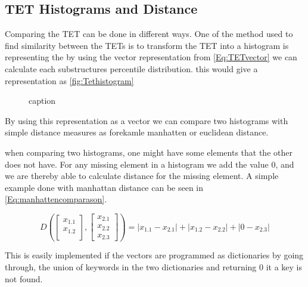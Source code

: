 \subsection{TET Histograms and Distance}
	Comparing the TET can be done in different ways. One of the method used to find similarity between the TETs is to transform the TET into a histogram is representing the by using the vector representation from \autoref{Eq:TETvector} we can calculate each substructures percentile distribution. this would give a representation as \autoref{fig:Tethistogram}
	
	\begin{figure}[H]
		\centering
		\begin{adjustbox}{width=0.5\textwidth}
			
		\end{adjustbox}
		\caption{caption}
		\label{fig:Tethistogram}
	\end{figure}
	
	By using this representation as a vector we can compare two histograms with simple distance measures as forekamle manhatten or euclidean distance.
	
	when comparing two histograms, one might have some elements that the other does not have. For any missing element in a histogram we add the value $0$, and we are thereby able to calculate distance for the missing element. A simple example done with manhattan distance can be seen in \autoref{Eq:manhattencomparason}.
	
	\begin{equation}\label{Eq:manhattencomparason}
	D(\begin{bmatrix}
	x_{1.1} \\
	x_{1.2} \\
	\end{bmatrix},
	\begin{bmatrix}
	x_{2.1} \\
	x_{2.2} \\
	x_{2.3}
	\end{bmatrix})= |x_{1.1} - x_{2.1}| + |x_{1.2} - x_{2.2}| + |0 - x_{2.3}|
	\end{equation}
	
	This is easily implemented if the vectors are programmed as dictionaries by going through, the union of keywords in the two dictionaries and returning 0 it a key is not found.
